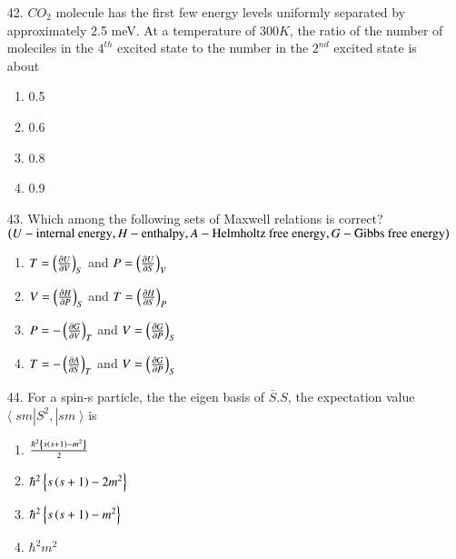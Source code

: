 \documentclass[journal,12pt,onecolumn]{IEEEtran}
\theoremstyle{remark}
\begin{document}
\begin{enumerate}
\begin{enumerate}
            \end{enumerate}

         \item[42.] $CO_2$ molecule has the first few energy levels uniformly separated by approximately
             2.5 meV. At a temperature of $300K$, the ratio of the number of moleciles in the $4^{th}$
             excited state to the number in the $2^{nd}$ excited state is about 
            \hfill{}
            \begin{enumerate}
                \item 0.5
                \item 0.6
                \item 0.8
                \item 0.9
            \end{enumerate}

        \item[43.] Which among the following sets of Maxwell relations is correct? $\left(U -
            \textnormal{internal energy},\\ H - \textnormal{enthalpy}, A - \textnormal{Helmholtz free energy},
            G - \textnormal{Gibbs free energy}\right)$ 

            \hfill{}
            \begin{enumerate}
                \item $T = \left(\frac{\partial U}{\partial V}\right)_S$ and  $P = \left(\frac{\partial U}{\partial S}\right)_V$
                \item $V = \left(\frac{\partial H}{\partial P}\right)_S$ and  $T = \left(\frac{\partial H}{\partial S}\right)_P$
                \item $P = -\left(\frac{\partial G}{\partial V}\right)_T$ and  $V = \left(\frac{\partial G}{\partial P}\right)_S$
                \item $T = -\left(\frac{\partial A}{\partial S}\right)_T$ and  $V = \left(\frac{\partial G}{\partial P}\right)_S$
            \end{enumerate}

        \item[44.] For a spin-s particle, the the eigen basis of $\bar{S}.S$, the expectation value
            $\langle \; sm|S^2,|sm \; \rangle$ is

            \hfill{}
            \begin{enumerate}
                \item $\frac{\hbar ^ 2 \left\{s\left(s + 1\right) - m^2\right\}}{2}$
                \item $\hbar ^ 2 \left\{s\left(s + 1\right) - 2m^2\right\}$
                \item $\hbar ^ 2 \left\{s\left(s + 1\right) - m^2\right\}$
                \item $\hbar ^2 m^2$
            \end{enumerate}


\end{enumerate}
\end{document}
